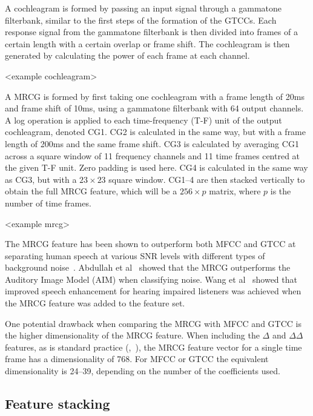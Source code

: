 A cochleagram is formed by passing an input signal through a gammatone
filterbank, similar to the first steps of the formation of the GTCCs\@. Each
response signal from the gammatone filterbank is then divided into frames of a
certain length with a certain overlap or frame shift. The cochleagram is then
generated by calculating the power of each frame at each channel.

<example cochleagram>

A MRCG is formed by first taking one cochleagram with a frame length of 20ms and
frame shift of 10ms, using a gammatone filterbank with 64 output channels. A log
operation is applied to each time-frequency (T-F) unit of the output
cochleagram, denoted CG1. CG2 is calculated in the same way, but with a frame
length of 200ms and the same frame shift. CG3 is calculated by averaging CG1
across a square window of 11 frequency channels and 11 time frames centred at
the given T-F unit. Zero padding is used here. CG4 is calculated in the same way
as CG3, but with a $23 \times 23$ square window. CG1--4 are then stacked
vertically to obtain the full MRCG feature, which will be a $256 \times p$
matrix, where $p$ is the number of time frames.

<example mrcg>

The MRCG feature has been shown to outperform both MFCC and GTCC at
separating human speech at various SNR levels with different types of
background noise~\cite{chen2014feature}. Abdullah et
al~\cite{binti2020comparison} showed that the MRCG outperforms the Auditory
Image Model (AIM) when classifying noise. Wang et al~\cite{wang2016joint} showed
that improved speech enhancement for hearing impaired listeners was achieved
when the MRCG feature was added to the feature set.

One potential drawback when comparing the MRCG with MFCC and GTCC is the higher
dimensionality of the MRCG feature. When including the $\Delta$ and
$\Delta\Delta$ features, as is standard practice
(\cite{binti2020comparison},~\cite{wang2016joint}), the MRCG feature vector for
a single time frame has a dimensionality of 768. For MFCC or GTCC the equivalent
dimensionality is 24--39, depending on the number of the coefficients used.

\subsection{Feature stacking}

